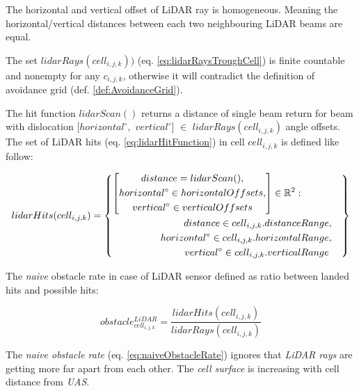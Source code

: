 \noindent The horizontal and vertical offset of LiDAR ray is homogeneous. Meaning the horizontal/vertical distances between each two neighbouring LiDAR beams are equal.

The set $lidar Rays(cell_{i,j,k}))$ (eq. \ref{eq:lidarRaysTroughCell}) is finite countable and nonempty for any $c_{i,j,k}$, otherwise it will contradict   the definition of avoidance grid (def. \ref{def:AvoidanceGrid}).

\noindent The hit function $lidarScan()$ returns a distance of single beam return for beam with dislocation $[horizontal^\circ,$ $vertical^\circ]$ $\in$ $lidar Rays(cell_{i,j,k})$ angle offsets. The set of LiDAR hits (eq. \ref{eq:lidarHitFunction}) in cell $cell_{i,j,k}$ is defined like follow:

\begin{equation}\label{eq:lidarHitFunction}
    lidar Hits(cell_{i,j,k})=\left\{
        \begin{aligned}
        \left[
            \begin{gathered}
                distance=lidar Scan(),\\
                horizontal^\circ\in horizontal Offsets,\\
                vertical^\circ\in vertical Offsets
            \end{gathered}
        \right]\in\mathbb{R}^2:&\\
        distance \in cell_{i,j,k}.distance &Range,\\
        horizontal^\circ\in cell_{i,j,k}.horizontal &Range,\\
        vertical^\circ\in cell_{i,j,k}.vertical &Range\\
        \end{aligned}
    \right\}
\end{equation}

\noindent The \emph{naive} obstacle rate in case of LiDAR sensor defined as ratio between landed hits and possible hits:

\begin{equation}\label{eq:naiveObstacleRate}
    obstacle^{LiDAR}_{cell_{i,j,k}}=\frac{lidar Hits(cell_{i,j,k})}{lidar Rays(cell_{i,j,k})}
\end{equation}

\begin{note}
    The \emph{naive obstacle rate} (eq. \ref{eq:naiveObstacleRate}) ignores that \emph{LiDAR rays} are getting more far apart from each other. The \emph{cell surface} is increasing with cell distance from \emph{UAS}.
\end{note}


